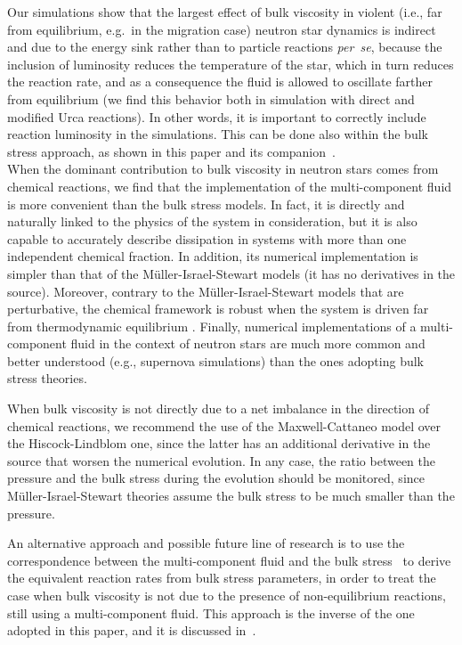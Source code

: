\documentclass[aps,prd,twocolumn,a4paper,floatfix,nofootbib,superscriptaddress,nofootinbib]{revtex4}
\begin{document}
Our simulations show that the largest effect of bulk viscosity in violent
(i.e., far from equilibrium, e.g.~in the migration case) neutron star dynamics
is indirect and due to the energy sink rather than to particle reactions
\textit{per~se}, because the inclusion of luminosity reduces the temperature of
the star, which in turn reduces the reaction rate, and as a consequence the
fluid is allowed to oscillate farther from equilibrium (we find this behavior
both in simulation with direct and modified Urca reactions).
%
In other words, it is important to correctly include reaction luminosity in the
simulations. This can be done also within the bulk stress approach, as shown in
this paper and its companion~\cite{Camelio22a}.\\

When the dominant contribution to bulk viscosity in neutron stars comes from chemical reactions, 
we find that the implementation of the multi-component fluid is more convenient than the bulk stress
models. In fact, it is directly and naturally linked to the physics of the system in consideration, but it is also
capable to accurately describe dissipation in systems with more than one independent chemical fraction.  
In addition, its numerical implementation is simpler than that of the
M\"uller-Israel-Stewart models (it has no derivatives in the source).
Moreover, contrary to the M\"uller-Israel-Stewart models that are perturbative, the chemical framework is
robust when the system is driven far from thermodynamic equilibrium \citep{Gavassino21bulk}.
Finally, numerical implementations of a multi-component fluid in the context of
neutron stars are much more common and better understood (e.g., supernova simulations)
than the ones adopting bulk stress theories.

When bulk viscosity is not directly due to a net imbalance in the direction of chemical reactions, 
we recommend the use of the Maxwell-Cattaneo model over the Hiscock-Lindblom one, since the latter has
an additional derivative in the source that worsen the numerical evolution.  
In any case, the ratio between the pressure and the bulk stress during the
evolution should be monitored, since M\"uller-Israel-Stewart theories assume the
bulk stress to be much smaller than the pressure.

An alternative approach and possible future line of research is to use the
correspondence between the multi-component fluid and the bulk
stress~\cite{Gavassino21bulk} to derive the equivalent reaction rates from
bulk stress parameters, in order to treat the case when bulk viscosity is not
due to the presence of non-equilibrium reactions, still using a multi-component fluid.
This approach is the inverse of the one adopted in this paper, and it is discussed in~\citet{Camelio22a}.
\end{document}
